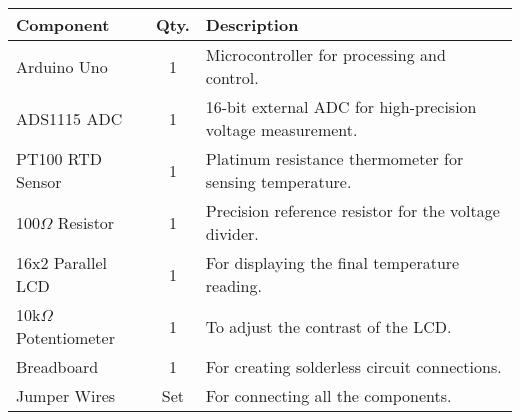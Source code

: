 \begin{tabular}{|l|c|p{4cm}|}
    \hline
    \textbf{Component} & \textbf{Qty.} & \textbf{Description} \\
    \hline
    Arduino Uno & 1 & Microcontroller for processing and control. \\
    \hline
    ADS1115 ADC & 1 & 16-bit external ADC for high-precision voltage measurement. \\
    \hline
    PT100 RTD Sensor & 1 & Platinum resistance thermometer for sensing temperature. \\
    \hline
    100$\Omega$ Resistor & 1 & Precision reference resistor for the voltage divider. \\
    \hline
    16x2 Parallel LCD & 1 & For displaying the final temperature reading. \\
    \hline
    10k$\Omega$ Potentiometer & 1 & To adjust the contrast of the LCD. \\
    \hline
    Breadboard & 1 & For creating solderless circuit connections. \\
    \hline
    Jumper Wires & Set & For connecting all the components. \\
    \hline
\end{tabular}